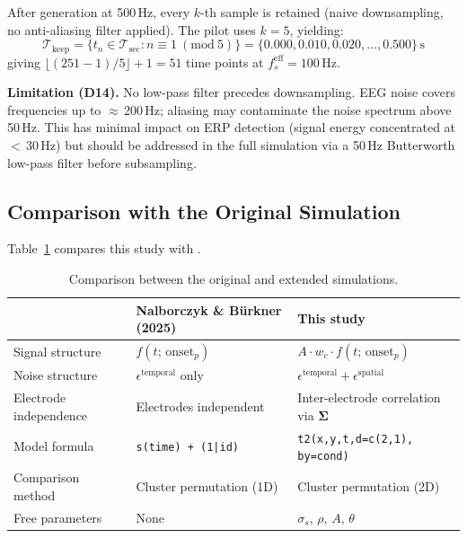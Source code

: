 \documentclass[12pt, a4paper]{article}
\begin{document}
After generation at 500\,Hz, every $k$-th sample is retained
(naive downsampling, no anti-aliasing filter applied).
The pilot uses $k = 5$, yielding:
%
\begin{equation}
  \mathcal{T}_\text{keep}
    = \{t_n \in \mathcal{T}_\text{sec} : n \equiv 1\ (\mathrm{mod}\ 5)\}
    = \{0.000, 0.010, 0.020, \ldots, 0.500\}\,\text{s}
\end{equation}
%
giving $\lfloor(251-1)/5\rfloor + 1 = 51$ time points at
$f_s^\text{eff} = 100\,\text{Hz}$.

\textbf{Limitation (D14).} No low-pass filter precedes downsampling.
EEG noise covers frequencies up to $\approx$\,200\,Hz; aliasing may
contaminate the noise spectrum above 50\,Hz.
This has minimal impact on ERP detection (signal energy concentrated at
$<$\,30\,Hz) but should be addressed in the full simulation via a
50\,Hz Butterworth low-pass filter before subsampling.

\subsection{Comparison with the Original Simulation}

Table~\ref{tab:comparison} compares this study with \citet{Nalborczyk2025}.

\begin{table}[ht]
\centering
\caption{Comparison between the original and extended simulations.}
\label{tab:comparison}
\small
\begin{tabular}{lll}
\toprule
 & \textbf{Nalborczyk \& Bürkner (2025)} & \textbf{This study} \\
\midrule
Signal structure
  & $f(t;\,\mathrm{onset}_p)$
  & $A \cdot w_c \cdot f(t;\,\mathrm{onset}_p)$ \\
Noise structure
  & $\epsilon^\text{temporal}$ only
  & $\epsilon^\text{temporal} + \epsilon^\text{spatial}$ \\
Electrode independence
  & Electrodes independent
  & Inter-electrode correlation via $\boldsymbol{\Sigma}$ \\
Model formula
  & \texttt{s(time) + (1|id)}
  & \texttt{t2(x,y,t,d=c(2,1), by=cond)} \\
Comparison method
  & Cluster permutation (1D)
  & Cluster permutation (2D) \\
Free parameters
  & None
  & $\sigma_s,\, \rho,\, A,\, \theta$ \\
\bottomrule
\end{tabular}
\end{table}
\end{document}
